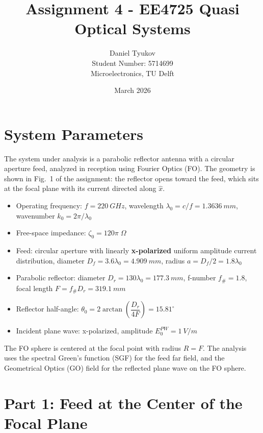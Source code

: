 \documentclass{article}
\title{Assignment 4 - EE4725 Quasi Optical Systems}
\author{Daniel Tyukov \\ Student Number: 5714699 \\ Microelectronics, TU Delft}
\date{March 2026}
\begin{document}
\maketitle

\tableofcontents
\newpage

\section{System Parameters}

The system under analysis is a parabolic reflector antenna with a circular aperture feed, analyzed in reception using Fourier Optics (FO). The geometry is shown in Fig.~1 of the assignment: the reflector opens toward the feed, which sits at the focal plane with its current directed along $\hat{x}$.

\begin{itemize}
\item Operating frequency: $f = \SI{220}{GHz}$, wavelength $\lambda_0 = c/f = \SI{1.3636}{mm}$, wavenumber $k_0 = 2\pi/\lambda_0$
\item Free-space impedance: $\zeta_0 = 120\pi\;\Omega$
\item Feed: circular aperture with linearly \textbf{x-polarized} uniform amplitude current distribution, diameter $D_f = 3.6\lambda_0 = \SI{4.909}{mm}$, radius $a = D_f/2 = 1.8\lambda_0$
\item Parabolic reflector: diameter $D_r = 130\lambda_0 = \SI{177.3}{mm}$, f-number $f_\# = 1.8$, focal length $F = f_\# D_r = \SI{319.1}{mm}$
\item Reflector half-angle: $\theta_0 = 2\arctan\!\left(\dfrac{D_r}{4F}\right) = 15.81^\circ$
\item Incident plane wave: x-polarized, amplitude $E_0^{PW} = \SI{1}{V/m}$
\end{itemize}

The FO sphere is centered at the focal point with radius $R = F$. The analysis uses the spectral Green's function (SGF) for the feed far field, and the Geometrical Optics (GO) field for the reflected plane wave on the FO sphere.

\section{Part 1: Feed at the Center of the Focal Plane}
\end{document}
